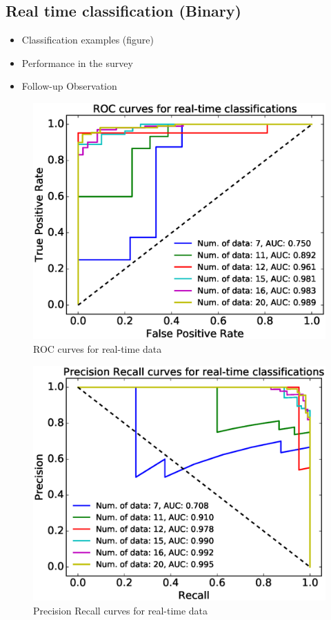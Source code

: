 \documentclass{pasj01}
\begin{document}
\subsection{Real time classification (Binary)}
\begin{itemize}
\item Classification examples (figure)
\item Performance in the survey
\item Follow-up Observation
\end{itemize}
%
\begin{figure}[ht]
  \begin{center}
     \includegraphics[width=\columnwidth]{figures/Realtime_ROCs.eps}
  \end{center}
  \caption{%
  ROC curves for real-time data
  }%
  \label{fig:realtimeROCs}
\end{figure}
%
%
\begin{figure}[ht]
  \begin{center}
     \includegraphics[width=\columnwidth]{figures/Realtime_PreRecs.eps}
  \end{center}
  \caption{%
  Precision Recall curves for real-time data
  }%
  \label{fig:realtimePreRecs}
\end{figure}
\end{document}
